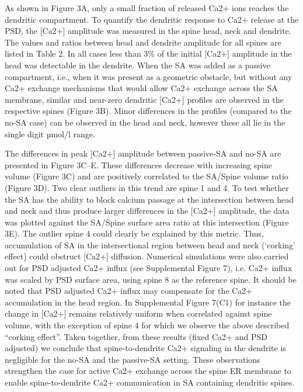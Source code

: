 \documentclass[fleqn,12pt]{wlscirep}
\begin{document}
As shown in Figure 3A, only a small fraction of released Ca2+ ions reaches the dendritic compartment. To quantify the dendritic response to Ca2+ release at the PSD, the [Ca2+] amplitude was measured in the spine head, neck and dendrite. The values and ratios between head and dendrite amplitude for all spines are listed in Table 2. In all cases less than 3\% of the initial [Ca2+] amplitude in the head was detectable in the dendrite. When the SA was added as a passive compartment, i.e., when it was present as a geometric obstacle, but without any Ca2+ exchange mechanisms that would allow Ca2+ exchange across the SA membrane, similar and near-zero dendritic [Ca2+] profiles are observed in the respective spines (Figure 3B). Minor differences in the profiles (compared to the no-SA case) can be observed in the head and neck, however these all lie in the single digit µmol/l range.

The differences in peak [Ca2+] amplitude between passive-SA and no-SA are presented in Figure 3C–E. These differences decrease with increasing spine volume (Figure 3C) and are positively correlated to the SA/Spine volume ratio (Figure 3D). Two clear outliers in this trend are spine 1 and 4. To test whether the SA has the ability to block calcium passage at the intersection between head and neck and thus produce larger differences in the [Ca2+] amplitude, the data was plotted against the SA/Spine surface area ratio at this intersection (Figure 3E). The outlier spine 4 could clearly be explained by this metric. Thus, accumulation of SA in the intersectional region between head and neck (‘corking’ effect) could obstruct [Ca2+] diffusion. Numerical simulations were also carried out for PSD adjusted Ca2+ influx (see Supplemental Figure 7), i.e. Ca2+  influx was scaled by PSD surface area, using spine 8 as the reference spine. It should be noted that PSD adjusted Ca2+ influx may compensate for the Ca2+ accumulation in the head region. In Supplemental Figure 7(C1) for instance the change in [Ca2+] remains relatively uniform when correlated against spine volume, with the exception of spine 4 for which we observe the above described “corking effect”. Taken together, from these results (fixed Ca2+ and PSD adjusted) we conclude that spine-to-dendrite Ca2+ signaling in the dendrite is negligible for the no-SA and the passive-SA setting. These observations strengthen the case for active Ca2+ exchange across the spine ER membrane to enable spine-to-dendrite Ca2+ communication in SA containing dendritic spines.
\end{document}
